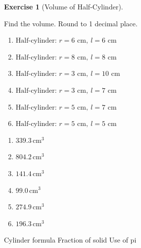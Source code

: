 \documentclass[
  letterpaper,
  DIV=11,
  numbers=noendperiod]{scrreprt}
\theoremstyle{definition}
\newtheorem{exercise}{Exercise}[chapter]
\theoremstyle{remark}
\begin{document}
\begin{exercise}[Volume of
Half-Cylinder]\protect\hypertarget{exr-vol-8}{}\label{exr-vol-8}

Find the volume. Round to 1 decimal place.

\begin{enumerate}
\def\labelenumi{\alph{enumi})}
\item
  \(\text{Half-cylinder: }r=6\text{ cm},\ l=6\text{ cm}\)
\item
  \(\text{Half-cylinder: }r=8\text{ cm},\ l=8\text{ cm}\)
\item
  \(\text{Half-cylinder: }r=3\text{ cm},\ l=10\text{ cm}\)
\item
  \(\text{Half-cylinder: }r=3\text{ cm},\ l=7\text{ cm}\)
\item
  \(\text{Half-cylinder: }r=5\text{ cm},\ l=7\text{ cm}\)
\item
  \(\text{Half-cylinder: }r=5\text{ cm},\ l=5\text{ cm}\)
\end{enumerate}

\begin{tcolorbox}[enhanced jigsaw, opacitybacktitle=0.6, coltitle=black, arc=.35mm, colframe=quarto-callout-tip-color-frame, colback=white, bottomrule=.15mm, left=2mm, colbacktitle=quarto-callout-tip-color!10!white, titlerule=0mm, opacityback=0, title=\textcolor{quarto-callout-tip-color}{\faLightbulb}\hspace{0.5em}{🔍 View Solution}, leftrule=.75mm, breakable, rightrule=.15mm, bottomtitle=1mm, toptitle=1mm, toprule=.15mm]

\begin{enumerate}
\def\labelenumi{\alph{enumi})}
\item
  \(339.3\,\text{cm}^{3}\)
\item
  \(804.2\,\text{cm}^{3}\)
\item
  \(141.4\,\text{cm}^{3}\)
\item
  \(99.0\,\text{cm}^{3}\)
\item
  \(274.9\,\text{cm}^{3}\)
\item
  \(196.3\,\text{cm}^{3}\)
\end{enumerate}

\end{tcolorbox}

{Cylinder formula} {Fraction of solid} {Use of pi}

\end{exercise}
\end{document}
